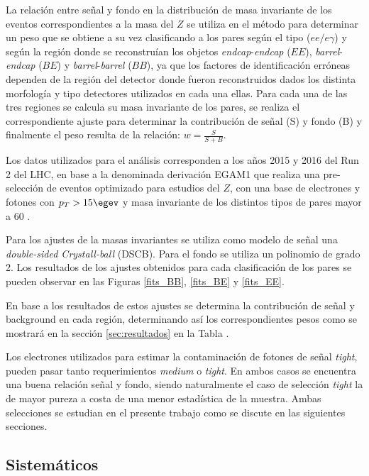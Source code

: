 La relación entre señal y fondo en la distribución de masa invariante de los eventos correspondientes a la masa del $Z$ se utiliza en el método para determinar un peso que se obtiene a su vez clasificando a los pares según el tipo ($ee/e\gamma$) y según la región donde se reconstruían los objetos \textit{endcap}-\textit{endcap} ($EE$), \textit{barrel}-\textit{endcap} ($BE$) y \textit{barrel}-\textit{barrel} ($BB$), ya que los factores de identificación erróneas dependen de la región del detector donde fueron reconstruidos dados los distinta morfología y tipo detectores utilizados en cada una ellas. Para cada una de las tres regiones se calcula su masa invariante de los pares, se realiza el correspondiente ajuste para determinar la contribución de señal (S) y fondo (B) y finalmente el peso resulta de la relación: $w=\frac{S}{S+B}$. 

Los datos utilizados para el análisis corresponden a los años 2015 y 2016 del Run 2 del LHC, en base a la denominada derivación EGAM1 que realiza una pre-selección de eventos optimizado para estudios del $Z$, con una base de electrones y fotones con $p_{T} > 15 \egev$ y masa invariante de los distintos tipos de pares mayor a 60 \egev. %

Para los ajustes de la masas invariantes se utiliza como modelo de señal una \textit{double-sided Crystall-ball} (DSCB). Para el fondo se utiliza un polinomio de grado 2. Los resultados de los ajustes obtenidos para cada clasificación de los pares se pueden observar en las Figuras \ref{fits_BB}, \ref{fits_BE} y \ref{fits_EE}.


En base a los resultados de estos ajustes se determina la contribución de señal y background en cada región, determinando así los correspondientes pesos como se mostrará en la sección \ref{sec:resultados} en la Tabla \label{ta:fftable} .

Los electrones utilizados para estimar la contaminación de fotones de señal \textit{tight}, pueden pasar tanto requerimientos  \textit{medium} o \textit{tight}. En ambos casos se encuentra una buena relación señal y fondo, siendo naturalmente el caso de selección \textit{tight} la de mayor pureza a costa de una menor estadística de la muestra. Ambas selecciones se estudian en el presente trabajo como se discute en las siguientes secciones.


\subsection{Sistemáticos}

